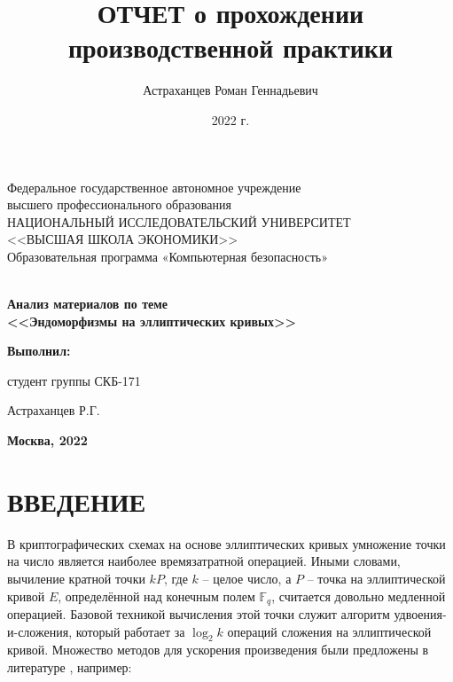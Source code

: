 \documentclass[a4paper,12pt]{article}
\author{Астраханцев Роман Геннадьевич}
\title{ОТЧЕТ о прохождении производственной практики}
\date{2022 г.}
\theoremstyle{definition}
\theoremstyle{underline}
\begin{document}
	
	\thispagestyle{empty}
	\begin{center}
		Федеральное государственное автономное учреждение \\ высшего профессионального образования \\

		НАЦИОНАЛЬНЫЙ ИССЛЕДОВАТЕЛЬСКИЙ УНИВЕРСИТЕТ \\ <<ВЫСШАЯ ШКОЛА ЭКОНОМИКИ>> \\
		\vspace{2ex}
		Образовательная программа «Компьютерная безопасность» \\
	\end{center}

	\begin{center}
		\vspace{15ex}
		\textbf{ \\ \vspace{3ex} Анализ материалов по теме \\ <<Эндоморфизмы на эллиптических кривых>>}
	\end{center}

	\vspace{17ex}

	\hspace{0.6\linewidth} 	\textbf{Выполнил:} 
	
	\hspace{0.6\linewidth}  студент группы СКБ-171 
	
	\hspace{0.6\linewidth}  Астраханцев Р.Г. 


	
	\begin{center}
		
		\vfill
		\textbf{Москва, 2022}
	\end{center}
	
	\newpage
	\tableofcontents
	
	\newpage
	\section*{ВВЕДЕНИЕ}
	
	В криптографических схемах на основе эллиптических кривых умножение точки на число является наиболее времязатратной операцией. Иными словами, вычиление кратной точки $k P$, где $k$ -- целое число, а $P$ -- точка на эллиптической кривой $E$, определённой над конечным полем $\mathbb{F}_q$, считается довольно медленной операцией. Базовой техникой вычисления этой точки служит алгоритм удвоения-и-сложения, который работает за $\log_2 k$ операций сложения на эллиптической кривой. Множество методов для ускорения произведения были предложены в литературе \cite{gordon1998survey, hankerson2000software, menezes2018handbook}, например:
	
\end{document}

